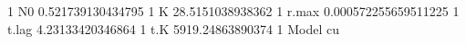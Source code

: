 1	N0	0.521739130434795
1	K	28.5151038938362
1	r.max	0.000572255659511225
1	t.lag	4.23133420346864
1	t.K	5919.24863890374
1	Model	cu
